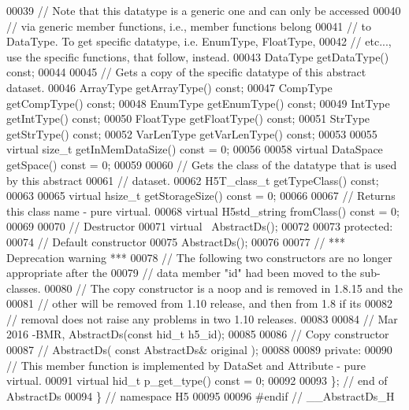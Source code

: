 \begin{DoxyCode}
00039         \textcolor{comment}{// Note that this datatype is a generic one and can only be accessed}
00040         \textcolor{comment}{// via generic member functions, i.e., member functions belong}
00041         \textcolor{comment}{// to DataType.  To get specific datatype, i.e. EnumType, FloatType,}
00042         \textcolor{comment}{// etc..., use the specific functions, that follow, instead.}
00043         DataType getDataType() \textcolor{keyword}{const};
00044 
00045         \textcolor{comment}{// Gets a copy of the specific datatype of this abstract dataset.}
00046         ArrayType getArrayType() \textcolor{keyword}{const};
00047         CompType getCompType() \textcolor{keyword}{const};
00048         EnumType getEnumType() \textcolor{keyword}{const};
00049         IntType getIntType() \textcolor{keyword}{const};
00050         FloatType getFloatType() \textcolor{keyword}{const};
00051         StrType getStrType() \textcolor{keyword}{const};
00052         VarLenType getVarLenType() \textcolor{keyword}{const};
00053 
00055         \textcolor{keyword}{virtual} \textcolor{keywordtype}{size\_t} getInMemDataSize() \textcolor{keyword}{const} = 0;
00056 
00058         \textcolor{keyword}{virtual} DataSpace getSpace() \textcolor{keyword}{const} = 0;
00059 
00060         \textcolor{comment}{// Gets the class of the datatype that is used by this abstract}
00061         \textcolor{comment}{// dataset.}
00062         H5T\_class\_t getTypeClass() \textcolor{keyword}{const};
00063 
00065         \textcolor{keyword}{virtual} hsize\_t getStorageSize() \textcolor{keyword}{const} = 0;
00066 
00067         \textcolor{comment}{// Returns this class name - pure virtual.}
00068         \textcolor{keyword}{virtual} H5std\_string fromClass() \textcolor{keyword}{const} = 0;
00069 
00070         \textcolor{comment}{// Destructor}
00071         \textcolor{keyword}{virtual} ~AbstractDs();
00072 
00073    \textcolor{keyword}{protected}:
00074         \textcolor{comment}{// Default constructor}
00075         AbstractDs();
00076 
00077         \textcolor{comment}{// *** Deprecation warning ***}
00078         \textcolor{comment}{// The following two constructors are no longer appropriate after the}
00079         \textcolor{comment}{// data member "id" had been moved to the sub-classes.}
00080         \textcolor{comment}{// The copy constructor is a noop and is removed in 1.8.15 and the}
00081         \textcolor{comment}{// other will be removed from 1.10 release, and then from 1.8 if its}
00082         \textcolor{comment}{// removal does not raise any problems in two 1.10 releases.}
00083 
00084         \textcolor{comment}{// Mar 2016 -BMR, AbstractDs(const hid\_t h5\_id);}
00085 
00086         \textcolor{comment}{// Copy constructor}
00087         \textcolor{comment}{// AbstractDs( const AbstractDs& original );}
00088 
00089    \textcolor{keyword}{private}:
00090         \textcolor{comment}{// This member function is implemented by DataSet and Attribute - pure virtual.}
00091         \textcolor{keyword}{virtual} hid\_t p\_get\_type() \textcolor{keyword}{const} = 0;
00092 
00093 \}; \textcolor{comment}{// end of AbstractDs}
00094 \} \textcolor{comment}{// namespace H5}
00095 
00096 \textcolor{preprocessor}{#endif // \_\_AbstractDs\_H}
\end{DoxyCode}
